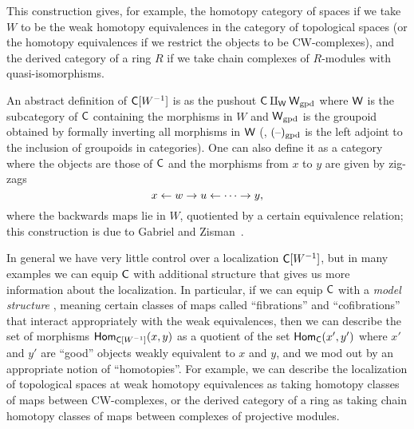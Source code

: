 \documentclass[a4paper,11pt]{article}
\begin{document}
This construction gives, for example, the homotopy category of spaces
if we take $W$ to be the weak homotopy equivalences in the category of
topological spaces (or the homotopy equivalences if we restrict the
objects to be CW-complexes), and the derived category of a ring $R$ if
we take chain complexes of $R$-modules with quasi-isomorphisms.

An abstract definition of $\textup{\textsf{C}}[W^{-1}]$ is as the pushout
$\textup{\textsf{C}} \amalg_{\textup{\textsf{W}}} \textup{\textsf{W}}_{\text{\textup{gpd}}}$ where $\textup{\textsf{W}}$ is the subcategory of
$\textup{\textsf{C}}$ containing the morphisms in $W$ and $\textup{\textsf{W}}_{\text{\textup{gpd}}}$ is the
groupoid obtained by formally inverting all morphisms in $\textup{\textsf{W}}$ (\ie{},
$(\text{\textendash})_{\text{\textup{gpd}}}$ is the left adjoint to the inclusion of
groupoids in categories). One can also define it as a category where
the objects are those of $\textup{\textsf{C}}$ and the morphisms from $x$ to $y$ are given by zig-zags
\[ x \from w \to u \from \cdots \to y,\]
where the backwards maps lie in $W$, quotiented by a certain equivalence
relation; this construction is due to Gabriel and
Zisman~\cite{GabrielZisman}.

\begin{remark}
  In general we have very little control over a localization
  $\textup{\textsf{C}}[W^{-1}]$, but in many examples we can equip $\textup{\textsf{C}}$ with
  additional structure that gives us more information about the
  localization. In particular, if we can equip $\textup{\textsf{C}}$ with a
  \emph{model structure} \cite{QuillenHtAlg}, meaning certain classes
  of maps called ``fibrations'' and ``cofibrations'' that interact
  appropriately with the weak equivalences, then we can describe the
  set of morphisms $\textup{\textsf{Hom}}_{\textup{\textsf{C}}[W^{-1}]}(x,y)$ as a quotient of the set
  $\textup{\textsf{Hom}}_{\textup{\textsf{C}}}(x',y')$ where $x'$ and $y'$ are ``good'' objects weakly
  equivalent to $x$ and $y$, and we mod out by an appropriate notion of
  ``homotopies''. For example, we can describe the localization of
  topological spaces at weak homotopy equivalences as taking homotopy
  classes of maps between CW-complexes, or the derived category of a
  ring as taking chain homotopy classes of maps between complexes of
  projective modules.
\end{remark}
\end{document}
